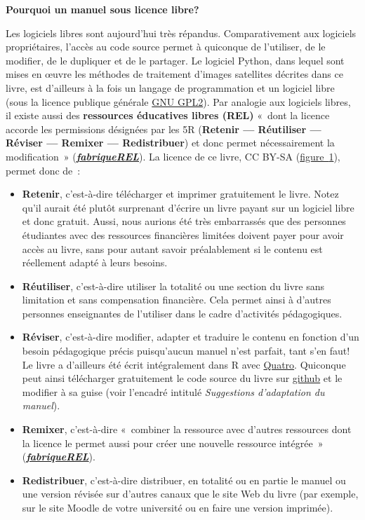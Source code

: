 \documentclass[
]{article}
\begin{document}
\textbf{Pourquoi un manuel sous licence libre?}

Les logiciels libres sont aujourd'hui très répandus. Comparativement aux
logiciels propriétaires, l'accès au code source permet à quiconque de
l'utiliser, de le modifier, de le dupliquer et de le partager. Le
logiciel Python, dans lequel sont mises en œuvre les méthodes de
traitement d'images satellites décrites dans ce livre, est d'ailleurs à
la fois un langage de programmation et un logiciel libre (sous la
licence publique générale
\href{https://fr.wikipedia.org/wiki/Licence_publique_g\%C3\%A9n\%C3\%A9rale_GNU}{GNU
GPL2}). Par analogie aux logiciels libres, il existe aussi des
\textbf{ressources éducatives libres (REL)} «~dont la licence accorde
les permissions désignées par les 5R (\textbf{Retenir --- Réutiliser ---
Réviser --- Remixer --- Redistribuer}) et donc permet nécessairement la
modification~»
(\href{https://fabriquerel.org/rel/}{\textbf{\emph{fabriqueREL}}}). La
licence de ce livre, CC BY-SA (\hyperref[fig-Licence]{figure~{1}}),
permet donc de~:

\begin{itemize}
\item
  \textbf{Retenir}, c'est-à-dire télécharger et imprimer gratuitement le
  livre. Notez qu'il aurait été plutôt surprenant d'écrire un livre
  payant sur un logiciel libre et donc gratuit. Aussi, nous aurions été
  très embarrassés que des personnes étudiantes avec des ressources
  financières limitées doivent payer pour avoir accès au livre, sans
  pour autant savoir préalablement si le contenu est réellement adapté à
  leurs besoins.
\item
  \textbf{Réutiliser}, c'est-à-dire utiliser la totalité ou une section
  du livre sans limitation et sans compensation financière. Cela permet
  ainsi à d'autres personnes enseignantes de l'utiliser dans le cadre
  d'activités pédagogiques.
\item
  \textbf{Réviser}, c'est-à-dire modifier, adapter et traduire le
  contenu en fonction d'un besoin pédagogique précis puisqu'aucun manuel
  n'est parfait, tant s'en faut! Le livre a d'ailleurs été écrit
  intégralement dans R avec \href{https://quarto.org/}{Quatro}.
  Quiconque peut ainsi télécharger gratuitement le code source du livre
  sur
  \href{https://github.com/SerieBoldR/MethodesAnalyseSpatiale}{github}
  et le modifier à sa guise (voir l'encadré intitulé \emph{Suggestions
  d'adaptation du manuel}).
\item
  \textbf{Remixer}, c'est-à-dire «~combiner la ressource avec d'autres
  ressources dont la licence le permet aussi pour créer une nouvelle
  ressource intégrée~»
  (\href{https://fabriquerel.org/rel/}{\textbf{\emph{fabriqueREL}}}).
\item
  \textbf{Redistribuer}, c'est-à-dire distribuer, en totalité ou en
  partie le manuel ou une version révisée sur d'autres canaux que le
  site Web du livre (par exemple, sur le site Moodle de votre université
  ou en faire une version imprimée).
\end{itemize}
\end{document}
